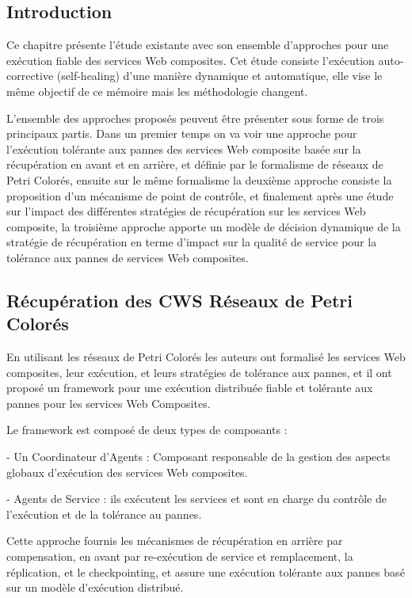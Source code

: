 
\subsection{Introduction}

Ce chapitre présente l'étude existante avec son ensemble d'approches pour une exécution fiable des services Web composites.
Cet étude consiste l'exécution auto-corrective (self-healing) d'une manière dynamique et automatique, elle vise le même objectif de ce mémoire mais les méthodologie changent. 

L'ensemble des approches proposés peuvent être présenter sous forme de trois principaux partis.
Dans un premier temps on va voir une approche pour l'exécution tolérante aux pannes des services Web composite basée sur la récupération en avant et en arrière, et définie par le formalisme de réseaux de Petri Colorés, ensuite sur le même formalisme la deuxième approche consiste la proposition d'un mécanisme de point de contrôle, et finalement après une étude sur l'impact des différentes stratégies de récupération sur les services Web composite, la troisième approche apporte un modèle de décision dynamique de la stratégie de récupération en terme d'impact sur la qualité de service pour la tolérance aux pannes de services Web composites.


\subsection{Récupération des CWS Réseaux de Petri Colorés}

En utilisant les réseaux de Petri Colorés les auteurs ont formalisé les services Web composites, leur exécution, et leurs stratégies de tolérance aux pannes, et il ont proposé un framework pour une exécution distribuée fiable et tolérante aux pannes pour les services Web Composites.

Le framework est composé de deux types de composants \cite{1} : 

- Un Coordinateur d'Agents : Composant responsable de la gestion des aspects globaux d'exécution des services Web composites.

- Agents de Service : ils exécutent les services et sont en charge du contrôle de l'exécution et de la tolérance au pannes.

Cette approche fournis les mécanismes de récupération en arrière par compensation, en avant par re-exécution de service et remplacement, la réplication, et le checkpointing, et assure une exécution tolérante aux pannes basé sur un modèle d'exécution distribué.

